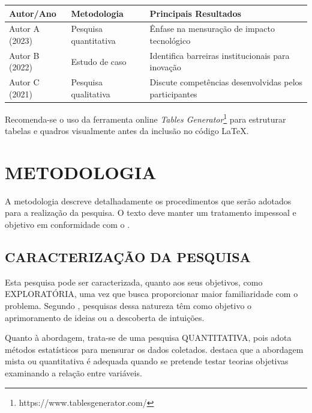 \begin{quadro}[htbp]
    \centering
    \caption{Exemplo de quadro qualitativo com efeito zebrado}
    \label{qua:estudos_zebrado}
    \begin{tabularx}{\textwidth}{|p{3cm}|p{4cm}|X|}
        \hline
        \textbf{Autor/Ano} & \textbf{Metodologia} & \textbf{Principais Resultados} \\
        \hline
        Autor A (2023) & Pesquisa quantitativa & Ênfase na mensuração de impacto tecnológico \\ \hline
        Autor B (2022) & Estudo de caso & Identifica barreiras institucionais para inovação \\ \hline
        Autor C (2021) & Pesquisa qualitativa & Discute competências desenvolvidas pelos participantes \\ \hline
    \end{tabularx}
\end{quadro}

Recomenda-se o uso da ferramenta online \textit{Tables Generator}\footnote{https://www.tablesgenerator.com/} para estruturar tabelas e quadros visualmente antes da inclusão no código LaTeX.


\chapter{METODOLOGIA}
\label{chap:metodologia}

A metodologia descreve detalhadamente os procedimentos que serão adotados para a realização da pesquisa. O texto deve manter um tratamento impessoal e objetivo em conformidade com o .

\section{CARACTERIZAÇÃO DA PESQUISA}
\label{sec:caracterizacao}

Esta pesquisa pode ser caracterizada, quanto aos seus objetivos, como EXPLORATÓRIA, uma vez que busca proporcionar maior familiaridade com o problema. Segundo , pesquisas dessa natureza têm como objetivo o aprimoramento de ideias ou a descoberta de intuições.

Quanto à abordagem, trata-se de uma pesquisa QUANTITATIVA, pois adota métodos estatísticos para mensurar os dados coletados.  destaca que a abordagem mista ou quantitativa é adequada quando se pretende testar teorias objetivas examinando a relação entre variáveis.

